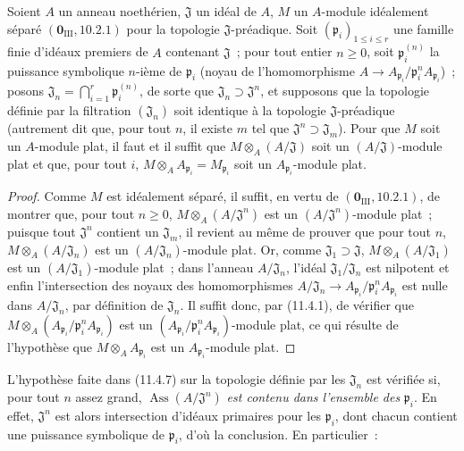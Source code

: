 \begin{proposition}[11.4.7]
\label{IV.11.4.7-fr}
Soient $A$ un anneau noethérien, $\mathfrak J$ un idéal de $A$, $M$ un
$A$-module idéalement séparé $(\mathbf 0_{\mathrm{III}},10.2.1)$ pour la
topologie $\mathfrak J$-préadique. Soit $(\mathfrak p_i)_{1\leq i\leq r}$ une
famille finie d'idéaux premiers de $A$ contenant $\mathfrak J$~; pour tout
entier $n\geq0$, soit $\mathfrak p_i^{(n)}$ la puissance symbolique $n$-ième de
$\mathfrak p_i$ (noyau de l'homomorphisme
$A\to A_{\mathfrak p_i}/\mathfrak p_i^nA_{\mathfrak p_i}$)~; posons
$\mathfrak J_n=\bigcap_{i=1}^{r}\mathfrak p_i^{(n)}$, de sorte que
$\mathfrak J_n\supset\mathfrak J^n$, et supposons que la topologie définie par
la filtration $(\mathfrak J_n)$ soit identique à la topologie
$\mathfrak J$-préadique (autrement dit que, pour tout $n$, il existe $m$ tel
que $\mathfrak J^n\supset\mathfrak J_m$). Pour que $M$ soit un $A$-module
plat, il faut et il suffit que $M\otimes_A(A/\mathfrak J)$ soit un
$(A/\mathfrak J)$-module plat et que, pour tout $i$,
$M\otimes_AA_{\mathfrak p_i}=M_{\mathfrak p_i}$ soit un
$A_{\mathfrak p_i}$-module plat.
\end{proposition}

\begin{proof}
Comme $M$ est idéalement séparé, il suffit, en vertu de
$(\mathbf 0_{\mathrm{III}},10.2.1)$, de montrer que, pour tout $n\geq0$,
$M\otimes_A(A/\mathfrak J^n)$ est un $(A/\mathfrak J^n)$-module plat~;
puisque tout $\mathfrak J^n$ contient un $\mathfrak J_m$, il revient au même
de prouver que pour tout $n$, $M\otimes_A(A/\mathfrak J_n)$ est un
$(A/\mathfrak J_n)$-module plat. Or, comme
$\mathfrak J_1\supset\mathfrak J$, $M\otimes_A(A/\mathfrak J_1)$ est un
$(A/\mathfrak J_1)$-module plat~; dans l'anneau $A/\mathfrak J_n$, l'idéal
$\mathfrak J_1/\mathfrak J_n$ est nilpotent et enfin l'intersection des noyaux
des homomorphismes
$A/\mathfrak J_n\longrightarrow
A_{\mathfrak p_i}/\mathfrak p_i^nA_{\mathfrak p_i}$
est nulle dans $A/\mathfrak J_n$, par définition de $\mathfrak J_n$. Il suffit
donc, par (11.4.1), de vérifier que
$M\otimes_A(A_{\mathfrak p_i}/\mathfrak p_i^nA_{\mathfrak p_i})$
est un $(A_{\mathfrak p_i}/\mathfrak p_i^nA_{\mathfrak p_i})$-module plat, ce
qui résulte de l'hypothèse que $M\otimes_AA_{\mathfrak p_i}$ est un
$A_{\mathfrak p_i}$-module plat.
\end{proof}

\begin{remark}[11.4.8]
\label{IV.11.4.8-fr}
L'hypothèse faite dans (11.4.7) sur la topologie définie par les
$\mathfrak J_n$ est vérifiée si, pour tout $n$ assez grand,
$\operatorname{Ass}(A/\mathfrak J^n)$ \emph{est contenu dans l'ensemble des}
$\mathfrak p_i$. En effet, $\mathfrak J^n$ est alors intersection d'idéaux
primaires pour les $\mathfrak p_i$, dont chacun contient une puissance
symbolique de $\mathfrak p_i$, d'où la conclusion. En particulier~:
\end{remark}

